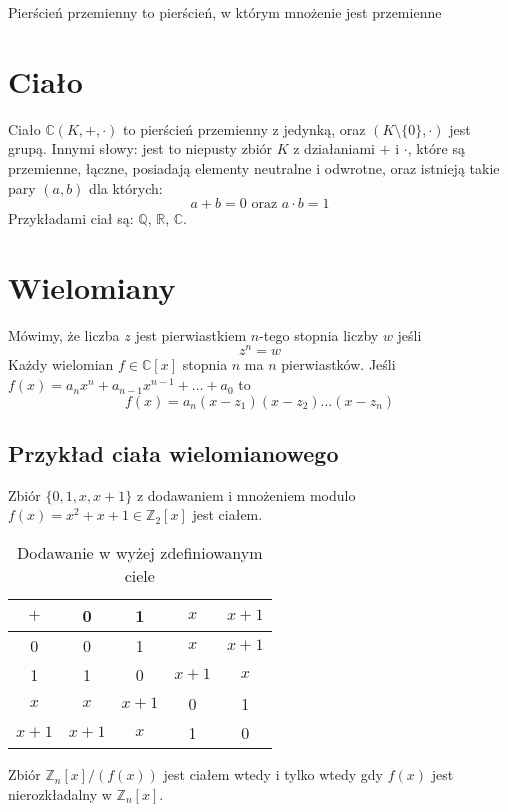 \documentclass{../notatki}
\begin{document}
Pierścień przemienny to pierścień, w którym mnożenie jest przemienne

\section{Ciało}

Ciało $\mathbb{C}(K, +, \cdot)$ to pierścień przemienny z jedynką, oraz $(K
\setminus \{0\}, \cdot)$ jest grupą.
Innymi słowy: jest to niepusty zbiór $K$ z działaniami $+$ i $\cdot$, które
są przemienne, łączne, posiadają elementy neutralne i odwrotne, oraz
istnieją takie pary $(a, b)$ dla których:
$$
a + b = 0 \text{ oraz } a \cdot b = 1
$$
Przykładami ciał są: $\mathbb{Q}$, $\mathbb{R}$, $\mathbb{C}$.

\section{Wielomiany}

Mówimy, że liczba $z$ jest pierwiastkiem $n$-tego stopnia liczby $w$ jeśli
$$
z^n = w
$$
Każdy wielomian $f \in \mathbb{C}[x]$ stopnia $n$ ma $n$
pierwiastków. Jeśli $f(x) = a_n x^n + a_{n-1} x^{n-1} + \dots + a_0$ to
$$
f(x) = a_n (x - z_1)(x - z_2) \dots (x - z_n)
$$

\subsection{Przykład ciała wielomianowego}

Zbiór $\{0, 1, x, x+1\}$ z dodawaniem i mnożeniem modulo $f(x) = x^2
+ x + 1 \in \mathbb{Z}_2[x]$ jest ciałem.

\begin{table*}[h]
  \centering
  \begin{tabular}{c|cccc}
    \hline
    $+$ & 0 & 1 & $x$ & $x + 1$ \\
    \hline
    0 & 0 & 1 & $x$ & $x + 1$ \\
    1 & 1 & 0 & $x + 1$ & $x$ \\
    $x$ & $x$ & $x + 1$ & 0 & 1 \\
    $x + 1$ & $x + 1$ & $x$ & 1 & 0 \\
    \hline
  \end{tabular}
  \caption{Dodawanie w wyżej zdefiniowanym ciele}
\end{table*}

Zbiór $\mathbb{Z}_n[x] / (f(x))$ jest ciałem wtedy i tylko wtedy gdy $f(x)$
jest nierozkładalny w $\mathbb{Z}_n[x]$.
\end{document}
